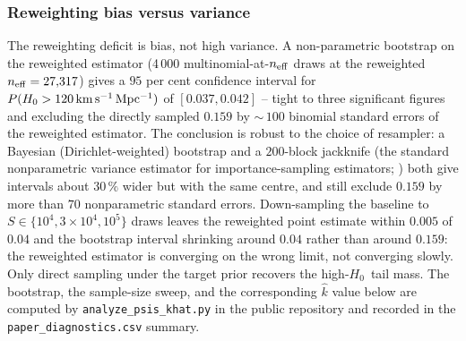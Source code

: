 \documentclass[usenatbib]{mnras}
\newcommand{\kmsmpc}{\ensuremath{\,\rm km\,s^{-1}\,Mpc^{-1}}\xspace}
\newcommand{\hzero}{\ensuremath{H_{0}}\xspace}
\begin{document}
\subsubsection{Reweighting bias versus variance} The reweighting deficit is bias, not high variance. A non-parametric bootstrap on the reweighted estimator (4\,000 multinomial-at-$n_{\rm eff}$ draws at the reweighted $n_{\rm eff}=27{,}317$) gives a $95$ per cent confidence interval for $P(\hzero>120\kmsmpc)$ of $[0.037, 0.042]$ -- tight to three significant figures and excluding the directly sampled $0.159$ by ${\sim}\,100$ binomial standard errors of the reweighted estimator. The conclusion is robust to the choice of resampler: a Bayesian (Dirichlet-weighted) bootstrap and a $200$-block jackknife (the standard nonparametric variance estimator for importance-sampling estimators; \citealp{Owen2013MonteCarlo}) both give intervals about $30\,\%$ wider but with the same centre, and still exclude $0.159$ by more than $70$ nonparametric standard errors. Down-sampling the baseline to $S\in\{10^{4},3\times 10^{4},10^{5}\}$ draws leaves the reweighted point estimate within $0.005$ of $0.04$ and the bootstrap interval shrinking around $0.04$ rather than around $0.159$: the reweighted estimator is converging on the wrong limit, not converging slowly. Only direct sampling under the target prior recovers the high-\hzero\ tail mass. The bootstrap, the sample-size sweep, and the corresponding $\hat{k}$ value below are computed by \texttt{analyze\_psis\_khat.py} in the public repository and recorded in the \texttt{paper\_diagnostics.csv} summary.
\end{document}
